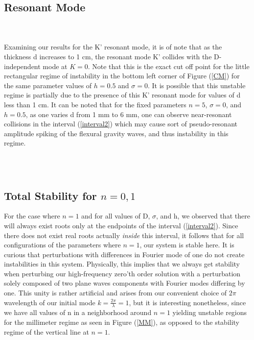 \documentclass{article}
\begin{document}
\subsection{Resonant Mode}
\\
\\
Examining our results for the K' resonant mode, it is of note that as the thickness d increases to 1 cm, the resonant mode K' collides with the D-independent mode at \(K = 0\). Note that this is the exact cut off point for the little rectangular regime of instability in the bottom left corner of Figure (\ref{CM}) for the same parameter values of \(h = 0.5\) and \(\sigma = 0\). It is possible that this unstable regime is partially due to the presence of this K' resonant mode for values of d less than 1 cm. It can be noted that for the fixed parameters \( n = 5\), \(\sigma = 0\), and \(h = 0.5\), as one varies d from 1 mm to 6 mm, one can observe near-resonant collisions in the interval (\ref{interval2}) which may cause sort of pseudo-resonant amplitude spiking of the flexural gravity waves, and thus instability in this regime. 

\\
\\

\subsection{Total Stability for \(n = 0,1\)}
For the case where \(n = 1\) and for all values of D, \(\sigma\), and h, we observed that there will always exist roots only at the endpoints of the interval (\ref{interval2}). Since there does not exist real roots actually \emph{inside} this interval, it follows that for all configurations of the parameters where \(n = 1\), our system is stable here. It is curious that perturbations with differences in Fourier mode of one do not create instabilities in this system. Physically, this implies that we always get stability when perturbing our high-frequency zero'th order solution with a perturbation solely composed of two plane waves components with Fourier modes differing by one. This unity is rather artificial and arises from our convenient choice of \(2\pi\) wavelength of our initial mode \(k = \frac{2\pi}{\lambda} = 1\), but it is interesting nonetheless, since we have all values of n in a neighborhood around \(n = 1\) yielding unstable regions for the millimeter regime as seen in Figure (\ref{MM}), as opposed to the stability regime of the vertical line at \(n = 1\). 
\\
\end{document}
